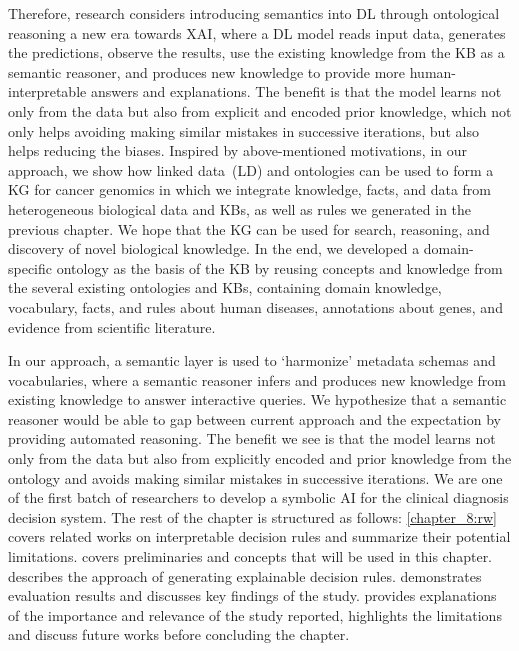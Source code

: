 \hspace*{3.5mm} Therefore, research considers introducing semantics into DL through ontological reasoning a new era towards XAI, where a DL model reads input data, generates the predictions, observe the results, use the existing knowledge from the KB as a semantic reasoner, and produces new knowledge to provide more human-interpretable answers and explanations. The benefit is that the model learns not only from the data but also from explicit and encoded prior knowledge, which not only helps avoiding making similar mistakes in successive iterations, but also helps reducing the biases. Inspired by above-mentioned motivations, in our approach, we show how linked data~(LD) and ontologies can be used to form a KG for cancer genomics in which we integrate knowledge, facts, and data from heterogeneous biological data and KBs, as well as rules we generated in the previous chapter. We hope that the KG can be used for search, reasoning, and discovery of novel biological knowledge. In the end, we developed a domain-specific ontology as the basis of the KB by reusing concepts and knowledge from the several existing ontologies and KBs, containing domain knowledge, vocabulary, facts, and rules about human diseases, annotations about genes, and evidence from scientific literature. 

\hspace*{3.5mm} In our approach, a semantic layer is used to `harmonize' metadata schemas and vocabularies, where a semantic reasoner infers and produces new knowledge from existing knowledge to answer interactive queries. We hypothesize that a semantic reasoner would be able to gap between current approach and the expectation by providing automated reasoning. The benefit we see is that the model learns not only from the data but also from explicitly encoded and prior knowledge from the ontology and avoids making similar mistakes in successive iterations. We are one of the first batch of researchers to develop a symbolic AI for the clinical diagnosis decision system. The rest of the chapter is structured as follows: \cref{chapter_8:rw} covers  related works on interpretable decision rules and summarize their potential limitations.  covers preliminaries and concepts that will be used in this chapter.  describes the approach of generating explainable decision rules.  demonstrates evaluation results and discusses key findings of the study.  provides explanations of the importance and relevance of the study reported, highlights the limitations and discuss future works before concluding the chapter.  

